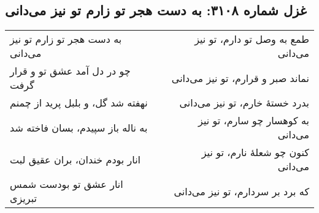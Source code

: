 \begin{center}
\section*{غزل شماره ۳۱۰۸: به دست هجر تو زارم تو نیز می‌دانی}
\label{sec:3108}
\begin{longtable}{l p{0.5cm} r}
به دست هجر تو زارم تو نیز می‌دانی
&&
طمع به وصل تو دارم، تو نیز می‌دانی
\\
چو در دل آمد عشق تو و قرار گرفت
&&
نماند صبر و قرارم، تو نیز می‌دانی
\\
نهفته شد گل، و بلبل پرید از چمنم
&&
بدرد خستهٔ خارم، تو نیز می‌دانی
\\
به ناله باز سپیدم، بسان فاخته شد
&&
به کوهسار چو سارم، تو نیز می‌دانی
\\
انار بودم خندان، بران عقیق لبت
&&
کنون چو شعلهٔ نارم، تو نیز می‌دانی
\\
انار عشق تو بودست شمس تبریزی
&&
که برد بر سردارم، تو نیز می‌دانی
\\
\end{longtable}
\end{center}
